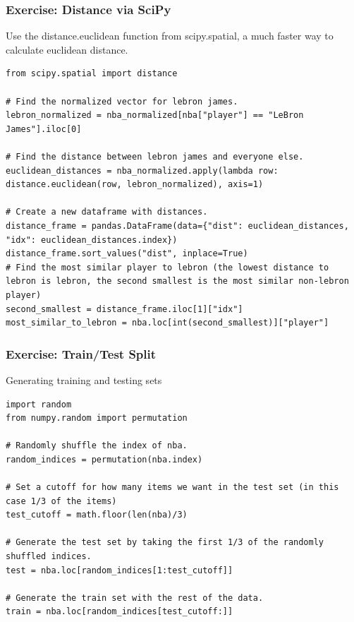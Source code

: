 \begin{frame}[fragile]\frametitle{Exercise: Distance via SciPy}
Use the distance.euclidean function from scipy.spatial, a much faster way to calculate euclidean distance.
\begin{lstlisting}
from scipy.spatial import distance

# Find the normalized vector for lebron james.
lebron_normalized = nba_normalized[nba["player"] == "LeBron James"].iloc[0]

# Find the distance between lebron james and everyone else.
euclidean_distances = nba_normalized.apply(lambda row: distance.euclidean(row, lebron_normalized), axis=1)

# Create a new dataframe with distances.
distance_frame = pandas.DataFrame(data={"dist": euclidean_distances, "idx": euclidean_distances.index})
distance_frame.sort_values("dist", inplace=True)
# Find the most similar player to lebron (the lowest distance to lebron is lebron, the second smallest is the most similar non-lebron player)
second_smallest = distance_frame.iloc[1]["idx"]
most_similar_to_lebron = nba.loc[int(second_smallest)]["player"]
\end{lstlisting}
\end{frame}

\begin{frame}[fragile]\frametitle{Exercise: Train/Test Split}
Generating training and testing sets
\begin{lstlisting}
import random
from numpy.random import permutation

# Randomly shuffle the index of nba.
random_indices = permutation(nba.index)

# Set a cutoff for how many items we want in the test set (in this case 1/3 of the items)
test_cutoff = math.floor(len(nba)/3)

# Generate the test set by taking the first 1/3 of the randomly shuffled indices.
test = nba.loc[random_indices[1:test_cutoff]]

# Generate the train set with the rest of the data.
train = nba.loc[random_indices[test_cutoff:]]
\end{lstlisting}
\end{frame}

